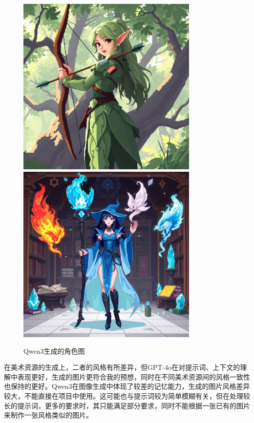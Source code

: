 \documentclass[12pt]{article}
\begin{document}
\begin{figure}[H]
    \centering
    \includegraphics[width=0.8\textwidth]{images/elf.png}
    \includegraphics[width=0.8\textwidth]{images/caster.png}
    \caption{Qwen3生成的角色图}
    \label{fig:qwen3-image}
\end{figure}
在美术资源的生成上，二者的风格有所差异，但GPT-4o在对提示词、上下文的理解中表现更好，生成的图片更符合我的预想，同时在不同美术资源间的风格一致性也保持的更好。Qwen3在图像生成中体现了较差的记忆能力，生成的图片风格差异较大，不能直接在项目中使用。这可能也与提示词较为简单模糊有关，但在处理较长的提示词，更多的要求时，其只能满足部分要求，同时不能根据一张已有的图片来制作一张风格类似的图片。
\end{document}
